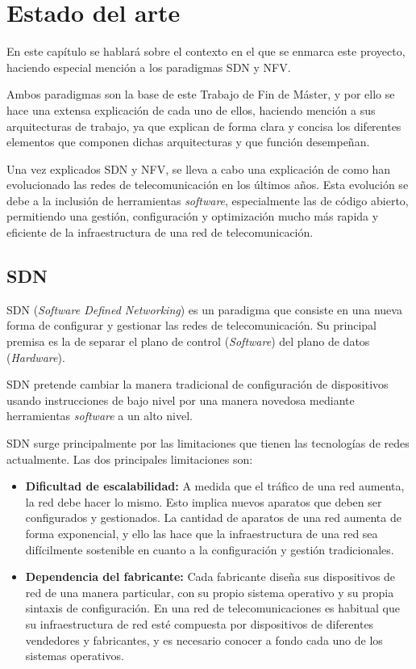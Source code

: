 \chapter{Estado del arte}
En este capítulo se hablará sobre el contexto en el que se enmarca este proyecto, haciendo especial mención a los paradigmas SDN y NFV.

Ambos paradigmas son la base de este Trabajo de Fin de Máster, y por ello se hace una extensa explicación de cada uno de ellos, haciendo mención a sus arquitecturas de trabajo, ya que explican de forma clara y concisa los diferentes elementos que componen dichas arquitecturas y que función desempeñan.

Una vez explicados SDN y NFV, se lleva a cabo una explicación de como han evolucionado las redes de telecomunicación en los últimos años. Esta evolución se debe a la inclusión de herramientas \textit{software}, especialmente las de código abierto, permitiendo una gestión, configuración y optimización mucho más rapida y eficiente de la infraestructura de una red de telecomunicación.

\section{SDN}
\label{sec:sdn}

SDN (\textit{Software Defined Networking}) es un paradigma que consiste en una nueva forma de configurar y gestionar las redes de telecomunicación. Su principal premisa es la de separar el plano de control (\textit{Software}) del plano de datos (\textit{Hardware}).

SDN pretende cambiar la manera tradicional de configuración de dispositivos usando instrucciones de bajo nivel por una manera novedosa mediante herramientas \textit{software} a un alto nivel.

SDN surge principalmente por las limitaciones que tienen las tecnologías de redes actualmente. Las dos principales limitaciones son:

\begin{itemize}
	\item \textbf{Dificultad de escalabilidad:} A medida que el tráfico de una red aumenta, la red debe hacer lo mismo. Esto implica nuevos aparatos que deben ser configurados y gestionados. La cantidad de aparatos de una red aumenta de forma exponencial, y ello las hace que la infraestructura de una red sea difícilmente sostenible en cuanto a la configuración y gestión tradicionales.
	
	\item \textbf{Dependencia del fabricante:} Cada fabricante diseña sus dispositivos de red de una manera particular, con su propio sistema operativo y su propia sintaxis de configuración. En una red de telecomunicaciones es habitual que su infraestructura de red esté compuesta por dispositivos de diferentes vendedores y fabricantes, y es necesario conocer a fondo cada uno de los sistemas operativos.
	
\end{itemize}

